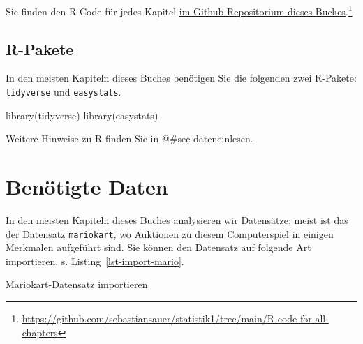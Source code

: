 \documentclass[
  letterpaper,
  oneside,
  open=any]{scrbook}
\newenvironment{Shaded}{\begin{snugshade}}{\end{snugshade}}
\newcommand{\FunctionTok}[1]{\textcolor[rgb]{0.28,0.35,0.67}{#1}}
\newcommand{\NormalTok}[1]{\textcolor[rgb]{0.00,0.23,0.31}{#1}}
\newcommand{\OtherTok}[1]{\textcolor[rgb]{0.00,0.23,0.31}{#1}}
\newcommand{\StringTok}[1]{\textcolor[rgb]{0.13,0.47,0.30}{#1}}
\theoremstyle{definition}
\theoremstyle{definition}
\theoremstyle{definition}
\theoremstyle{remark}
\begin{document}
Sie finden den R-Code für jedes Kapitel
\href{https://github.com/sebastiansauer/statistik1/tree/main/R-code-for-all-chapters}{im
Github-Repositorium dieses Buches}.\footnote{\url{https://github.com/sebastiansauer/statistik1/tree/main/R-code-for-all-chapters}}

\subsection{R-Pakete}\label{sec-rpckgs}

In den meisten Kapiteln dieses Buches benötigen Sie die folgenden zwei
R-Pakete: \texttt{tidyverse} und \texttt{easystats}.

\begin{Shaded}
\begin{Highlighting}[]
\FunctionTok{library}\NormalTok{(tidyverse)}
\FunctionTok{library}\NormalTok{(easystats)}
\end{Highlighting}
\end{Shaded}

Weitere Hinweise zu R finden Sie in @\#sec-dateneinlesen.

\section{Benötigte Daten}\label{benuxf6tigte-daten}

In den meisten Kapiteln dieses Buches analysieren wir Datensätze; meist
ist das der Datensatz \texttt{mariokart}, wo Auktionen zu diesem
Computerspiel in einigen Merkmalen aufgeführt sind. Sie können den
Datensatz auf folgende Art importieren, s.
Listing~\ref{lst-import-mario}.

\begin{codelisting}

\caption{\label{lst-import-mario}Mariokart-Datensatz importieren}

\centering{

\begin{Shaded}
\begin{Highlighting}[]
\NormalTok{mariokart }\OtherTok{\textless{}{-}} \FunctionTok{paste0}\NormalTok{(}
  \StringTok{"https://vincentarelbundock.github.io/Rdatasets/"}\NormalTok{,}
  \StringTok{"csv/openintro/mariokart.csv"}\NormalTok{)}

\NormalTok{mariokart }\OtherTok{\textless{}{-}} \FunctionTok{read.csv}\NormalTok{(mariokart\_path)}
\end{Highlighting}
\end{Shaded}

}

\end{codelisting}%
\end{document}
